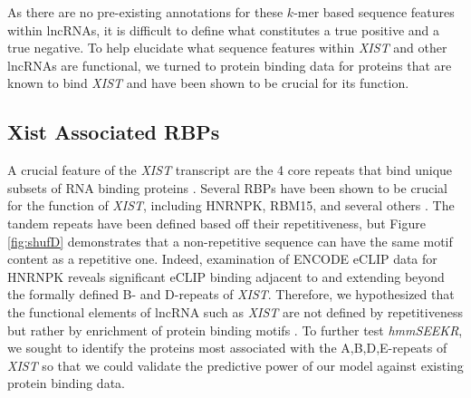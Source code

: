 As there are no pre-existing annotations for these $k$-mer based sequence features within lncRNAs, it is difficult to define what constitutes a true positive and a true negative. To help elucidate what sequence features within \emph{XIST} and other lncRNAs are functional, we turned to protein binding data for proteins that are known to bind \emph{XIST} and have been shown to be crucial for its function.

\subsection{Xist Associated RBPs}
A crucial feature of the \emph{XIST} transcript are the 4 core repeats that bind unique subsets of RNA binding proteins \cite{Sunwoo2017RepeatCIZ1,Zhao2008PolycombChromosome,Pintacuda2017HnRNPKSilencing,Wang2017TargetingGuanines,Hoki2009AMouse}. Several RBPs have been shown to be crucial for the function of \emph{XIST}, including HNRNPK, RBM15, and several others \cite{Sunwoo2017RepeatCIZ1,Zhao2008PolycombChromosome,Pintacuda2017HnRNPKSilencing,Wang2017TargetingGuanines,Hoki2009AMouse,Chu2015SystematicProteins}. The tandem repeats have been defined based off their repetitiveness, but Figure \ref{fig:shufD} demonstrates that a non-repetitive sequence can have the same motif content as a repetitive one. Indeed, examination of ENCODE eCLIP data for HNRNPK reveals significant eCLIP binding adjacent to and extending beyond the formally defined B- and D-repeats of \emph{XIST}. Therefore, we hypothesized that the functional elements of lncRNA such as \emph{XIST} are not defined by repetitiveness but rather by enrichment of protein binding motifs \cite{Kirk2018FunctionalContent,Sprague2019NonlinearDomains,Dominguez2018SequenceProteins,Ray2013ARegulation,Wang2017TargetingGuanines}. To further test \emph{hmmSEEKR}, we sought to identify the proteins most associated with the A,B,D,E-repeats of \emph{XIST} so that we could validate the predictive power of our model against existing protein binding data.
